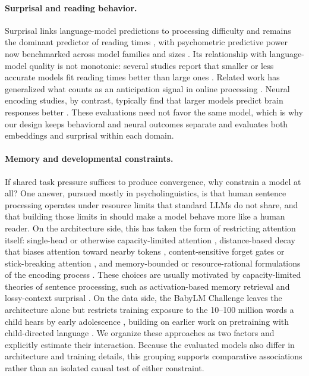 \paragraph{Surprisal and reading behavior.}
Surprisal links language-model predictions to processing difficulty \citep{hale2001probabilistic,levy2008expectation,smithlevy2013effect} and remains the dominant predictor of reading times \citep{goodkind2018predictive,wilcox2020predictive,wilcox2023testing}, with psychometric predictive power now benchmarked across model families and sizes \citep{kuribayashi2024psychometric}. Its relationship with language-model quality is not monotonic: several studies report that smaller or less accurate models fit reading times better than large ones \citep{ohschuler2023why,ohschuler2023twobillion,kuribayashi2021lower,wilcox2024bigger}. Related work has generalized what counts as an anticipation signal in online processing \citep{giulianelli2024generalized,opedal2024role}. Neural encoding studies, by contrast, typically find that larger models predict brain responses better \citep{schrimpf2021neural,caucheteux2022brains}. These evaluations need not favor the same model, which is why our design keeps behavioral and neural outcomes separate and evaluates both embeddings and surprisal within each domain.

\paragraph{Memory and developmental constraints.}
If shared task pressure suffices to produce convergence, why constrain a model at all? One answer, pursued mostly in psycholinguistics, is that human sentence processing operates under resource limits that standard LLMs do not share, and that building those limits in should make a model behave more like a human reader. On the architecture side, this has taken the form of restricting attention itself: single-head or otherwise capacity-limited attention \citep{timkey2023limited}, distance-based decay that biases attention toward nearby tokens \citep{press2021train,devarda2024locally,clark2025linear,thamma2025humanlike}, content-sensitive forget gates \citep{lin2025forgetting} or stick-breaking attention \citep{tan2025scaling}, and memory-bounded or resource-rational formulations of the encoding process \citep{hahn2022resourcerational,lieder2019resourcerational,xu2026memory,xufutrell2026strategic,rasmussen2017leftcorner,keshev2025working}. These choices are usually motivated by capacity-limited theories of sentence processing, such as activation-based memory retrieval \citep{lewisvasishth2005activation} and lossy-context surprisal \citep{futrell2020lossy}. On the data side, the BabyLM Challenge leaves the architecture alone but restricts training exposure to the 10--100 million words a child hears by early adolescence \citep{warstadt2023cfp,warstadt2023findings,hu2024secondbabylm}, building on earlier work on pretraining with child-directed language \citep{huebner2021babyberta}. We organize these approaches as two factors and explicitly estimate their interaction. Because the evaluated models also differ in architecture and training details, this grouping supports comparative associations rather than an isolated causal test of either constraint.

